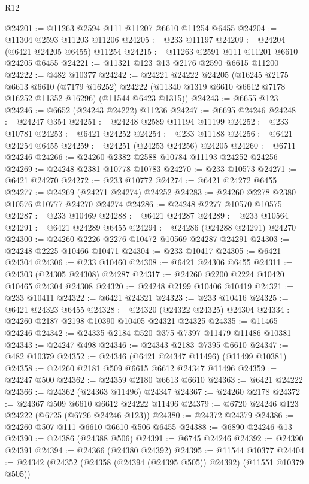\begin{lexlean}{R12}
\begin{coremodule}
@24201 := @11263 @2594 @111 @11207 @6610 @11254 @6455
@24204 := @11304 @2593 @11203 @11206
@24205 := @233 @11197
@24209 := @24204 (@6421 @24205 @6455) @11254
@24215 := @11263 @2591 @111 @11201 @6610 @24205 @6455
@24221 := @11321 @123 @13 @2176 @2590 @6615 @11200
@24222 := @482 @10377
@24242 := @24221
    @24222
    @24205
    (@16245
      @2175
      @6613
      @6610
      (@7179 @16252)
      @24222
      (@11340 @1319 @6610 @6612 @7178 @16252 @11352 @16296)
      (@11544 @6423 @1315))
@24243 := @6655 @123
@24246 := @6652 (@24243 @24222) @11236
@24247 := @6695 @24246
@24248 := @24247 @354
@24251 := @24248 @2589 @11194 @11199
@24252 := @233 @10781
@24253 := @6421 @24252
@24254 := @233 @11188
@24256 := @6421 @24254 @6455
@24259 := @24251 (@24253 @24256) @24205
@24260 := @6711 @24246
@24266 := @24260 @2382 @2588 @10784 @11193 @24252 @24256
@24269 := @24248 @2381 @10778 @10783
@24270 := @233 @10573
@24271 := @6421 @24270
@24272 := @233 @10772
@24274 := @6421 @24272 @6455
@24277 := @24269 (@24271 @24274) @24252
@24283 := @24260 @2278 @2380 @10576 @10777 @24270 @24274
@24286 := @24248 @2277 @10570 @10575
@24287 := @233 @10469
@24288 := @6421 @24287
@24289 := @233 @10564
@24291 := @6421 @24289 @6455
@24294 := @24286 (@24288 @24291) @24270
@24300 := @24260 @2226 @2276 @10472 @10569 @24287 @24291
@24303 := @24248 @2225 @10466 @10471
@24304 := @233 @10417
@24305 := @6421 @24304
@24306 := @233 @10460
@24308 := @6421 @24306 @6455
@24311 := @24303 (@24305 @24308) @24287
@24317 := @24260 @2200 @2224 @10420 @10465 @24304 @24308
@24320 := @24248 @2199 @10406 @10419
@24321 := @233 @10411
@24322 := @6421 @24321
@24323 := @233 @10416
@24325 := @6421 @24323 @6455
@24328 := @24320 (@24322 @24325) @24304
@24334 := @24260 @2187 @2198 @10390 @10405 @24321 @24325
@24335 := @11465 @24246
@24342 := @24335 @2184 @520 @375 @7397 @11479 @11486 @10381
@24343 := @24247 @498
@24346 := @24343 @2183 @7395 @6610
@24347 := @482 @10379
@24352 := @24346 (@6421 @24347 @11496) (@11499 @10381)
@24358 := @24260 @2181 @509 @6615 @6612 @24347 @11496
@24359 := @24247 @500
@24362 := @24359 @2180 @6613 @6610
@24363 := @6421 @24222
@24366 := @24362 (@24363 @11496) @24347
@24367 := @24260 @2178
@24372 := @24367 @509 @6610 @6612 @24222 @11496
@24379 := @6720 @24246 @123 @24222 (@6725 (@6726 @24246 @123))
@24380 := @24372 @24379
@24386 := @24260 @507 @111 @6610 @6610 @506 @6455
@24388 := @6890 @24246 @13
@24390 := @24386 (@24388 @506)
@24391 := @6745 @24246
@24392 := @24390 @24391
@24394 := @24366 (@24380 @24392)
@24395 := @11544 @10377
@24404 := @24342 (@24352 (@24358 (@24394 (@24395 @505)) @24392) (@11551 @10379 @505))

\end{coremodule}
\end{lexlean}
